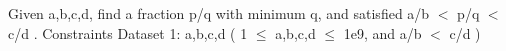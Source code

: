 Given a,b,c,d, find a fraction p/q with minimum q, and satisfied a/b $<$ p/q $<$ c/d .
Constraints
Dataset 1: a,b,c,d ( 1  $\le$  a,b,c,d  $\le$  1e9, and a/b $<$ c/d )
